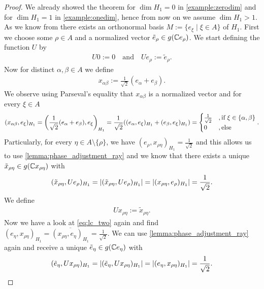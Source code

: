 \begin{proof}
	We already showed the theorem for $\dim H_1 = 0$ in \ref{example:zerodim} and for $\dim H_1 = 1$ in \ref{example:onedim}, hence from now on we assume $\dim H_1 > 1$. As we know from \cite{FAna1} there exists an orthonormal basis $M := \{e_\xi \mid \xi \in A\}$ of $H_1$. First we choose some $\rho \in A$ and a normalized vector $\tilde{e}_\rho \in g(\mathbb{C} e_\rho)$. We start defining the function $U$ by
	\begin{align*}
		U0 := 0 \quad \text{and} \quad Ue_\rho := \tilde{e}_\rho.
	\end{align*}
	Now for distinct $\alpha, \beta \in A$ we define
	\begin{align*}
		x_{\alpha \beta} := \frac{1}{\sqrt{2}} (e_\alpha + e_\beta).
	\end{align*}
	We observe using Parseval's equality that $x_{\alpha \beta}$ is a normalized vector and for every $\xi \in A$
	\begin{align}
		(x_{\alpha \beta}, e_\xi)_{H_1} = {\left ( \frac{1}{\sqrt{2}} (e_\alpha + e_\beta), e_\xi \right )}_{H_1} = \frac{1}{\sqrt{2}} {\left ( (e_\alpha, e_\xi)_{H_1} + (e_\beta, e_\xi)_{H_1} \right )} = 
		\begin{cases}
			\frac{1}{\sqrt{2}} &, \text{if } \xi \in \{\alpha, \beta\} \\
			0 &, \text{else}
		\end{cases}. \label{eq:lc_two}
	\end{align}
	Particularly, for every $\eta \in A \setminus \{\rho\}$, we have $(e_\rho, x_{\rho \eta})_{H_1} = \frac{1}{\sqrt{2}}$ and this allows us to use \ref{lemma:phase_adjustment_ray} and we know that there exists a unique $\tilde{x}_{\rho \eta} \in g(\mathbb{C} x_{\rho \eta})$ with
	\begin{align*}
		(\tilde{x}_{\rho \eta}, Ue_\rho)_{H_1} = {\left | (\tilde{x}_{\rho \eta}, Ue_\rho)_{H_1} \right |} = {\left | (x_{\rho \eta}, e_\rho)_{H_1} \right |} = \frac{1}{\sqrt{2}}.
	\end{align*}
	We define
	\begin{align*}
		U x_{\rho \eta} := \tilde{x}_{\rho \eta}.
	\end{align*}
	Now we have a look at \eqref{eq:lc_two} again and find $(e_\eta, x_{\rho \eta})_{H_1} = \overline{(x_{\rho \eta}, e_\eta)_{H_1}} = \frac{1}{\sqrt{2}}$. We can use \ref{lemma:phase_adjustment_ray} again and receive a unique $\tilde{e}_\eta \in g(\mathbb{C} e_\eta)$ with
	\begin{align*}
		(\tilde{e}_\eta, Ux_{\rho \eta})_{H_1} = \vbraces{(\tilde{e}_\eta, Ux_{\rho \eta})_{H_1}} = \vbraces{(e_\eta, x_{\rho \eta})_{H_1}} = \frac{1}{\sqrt{2}}.

\end{align*}
\end{proof}
